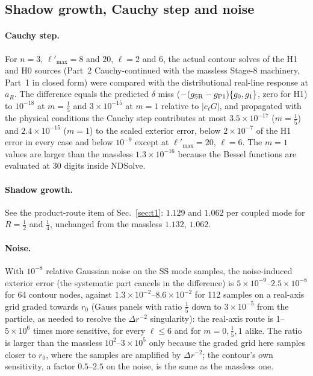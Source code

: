 \documentclass[11pt,a4paper]{article}
\newcommand{\lpm}{{\ell'_{\max}}}
\begin{document}
\subsection{Shadow growth, Cauchy step and noise}\label{sec:misc}
\paragraph{Cauchy step.}
For $n=3$, $\lpm=8$ and $20$, $\ell=2$ and $6$, the actual contour solves of the H1 and H0 sources (Part~2 Cauchy-continued with the massless Stage-8 machinery, Part~1 in closed form) were compared with the distributional real-line response at $a_R$.
The difference equals the predicted $\delta$ miss ($-(g_{\rm SR}-g_{\rm P1})\{g_0,g_1\}$, zero for H1) to $10^{-18}$ at $m=\tfrac15$ and $3\times10^{-15}$ at $m=1$ relative to $|c_\ell G|$, and propagated with the physical conditions the Cauchy step contributes at most $3.5\times10^{-17}$ ($m=\tfrac15$) and $2.4\times10^{-15}$ ($m=1$) to the scaled exterior error, below $2\times10^{-7}$ of the H1 error in every case and below $10^{-9}$ except at $\lpm=20$, $\ell=6$.
The $m=1$ values are larger than the massless $1.3\times10^{-16}$ because the Bessel functions are evaluated at 30 digits inside NDSolve.

\paragraph{Shadow growth.}
See the product-route item of Sec.~\ref{sec:t1}: $1.129$ and $1.062$ per coupled mode for $R=\tfrac12$ and $\tfrac14$, unchanged from the massless $1.132$, $1.062$.

\paragraph{Noise.}
With $10^{-8}$ relative Gaussian noise on the SS mode samples, the noise-induced exterior error (the systematic part cancels in the difference) is $5\times10^{-9}$--$2.5\times10^{-8}$ for 64 contour nodes, against $1.3\times10^{-2}$--$8.6\times10^{-2}$ for 112 samples on a real-axis grid graded towards $r_0$ (Gauss panels with ratio $\tfrac15$ down to $3\times10^{-5}$ from the particle, as needed to resolve the $\Delta r^{-2}$ singularity): the real-axis route is $1$--$5\times10^6$ times more sensitive, for every $\ell\le6$ and for $m=0,\tfrac15,1$ alike. The ratio is larger than the massless $10^2$--$3\times10^5$ only because the graded grid here samples closer to $r_0$, where the samples are amplified by $\Delta r^{-2}$; the contour's own sensitivity, a factor $0.5$--$2.5$ on the noise, is the same as the massless one.
\end{document}
